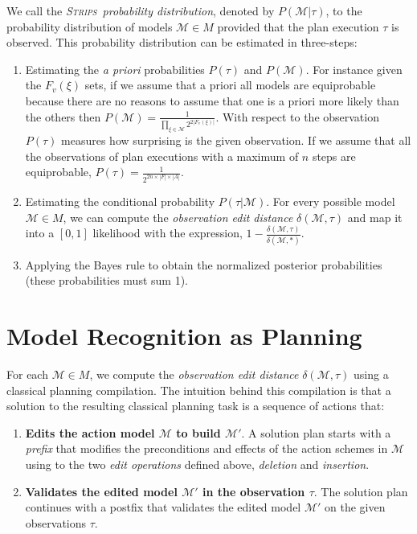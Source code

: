 \documentclass[letterpaper]{article} %
\newcommand{\strips}{\textsc{Strips}}     %
\begin{document}
We call the {\em \strips\ probability distribution}, denoted by $P(\mathcal{M}|\tau)$, to the probability distribution of models $\mathcal{M}\in M$ provided that the plan execution $\tau$ is observed. This probability distribution can be estimated in three-steps:
\begin{enumerate}
\item Estimating the {\em a priori} probabilities $P(\tau)$ and $P(\mathcal{M})$. For instance given the $F_v(\xi)$ sets, if we assume that a priori all models are equiprobable because there are no reasons to assume that
one is a priori more likely than the others then $P(\mathcal{M})=\frac{1}{\prod_{\xi\in\mathcal{M}} 2^{2|F_v(\xi)|}}$. With respect to the observation $P(\tau)$ measures how surprising is the given observation. If we assume that all the observations of plan executions with a maximum of $n$ steps are equiprobable, $P(\tau)=\frac{1}{2^{2n\times|F|\times |A|}}$.
\item Estimating the conditional probability $P(\tau|\mathcal{M})$. For every possible model $\mathcal{M}\in M$, we can compute the {\em observation edit distance} $\delta(\mathcal{M},\tau)$ and map it into a $[0,1]$ likelihood with the expression, $1-\frac{\delta(\mathcal{M},\tau)}{\delta(\mathcal{M},*)}$. 
\item Applying the Bayes rule to obtain the normalized posterior probabilities (these probabilities must sum 1).
\end{enumerate}


\section{Model Recognition as Planning}
\label{sec:asPlanning}
For each $\mathcal{M}\in M$, we compute the {\em observation edit distance} $\delta(\mathcal{M},\tau)$  using a classical planning compilation. The intuition behind this compilation is that a solution to the resulting classical planning task is a sequence of actions that:
\begin{enumerate}
\item {\bf Edits the action model $\mathcal{M}$ to build $\mathcal{M}'$}. A solution plan starts with a {\em prefix} that modifies the preconditions and effects of the action schemes in $\mathcal{M}$ using to the two {\em edit operations} defined above, {\em deletion} and {\em insertion}. 
\item {\bf Validates the edited model $\mathcal{M}'$ in the observation $\tau$}. The solution plan continues with a postfix that validates the edited model $\mathcal{M}'$ on the given observations $\tau$.
\end{enumerate}
\end{document}
